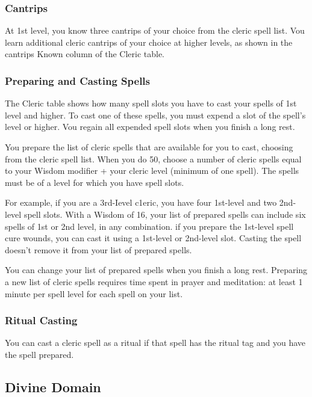 \documentclass[letterpaper,10pt,twoside,twocolumn,openany]{book}
\begin{document}
\subsubsection{Cantrips}

At 1st level, you know three cantrips of your choice from the cleric spell list. Vou learn additional cleric cantrips of your choice at higher levels, as shown in the cantrips Known column of the Cleric table.

\subsubsection{Preparing and Casting Spells}

The Cleric table shows how many spell slots you have to cast your spells of 1st level and higher. To cast one of these spells, you must expend a slot of the spell's level or higher. Vou regain all expended spell slots when you finish a long rest.

You prepare the list of cleric spells that are available for you to cast, choosing from the cleric spell list. When you do 50, choose a number of cleric spells equal to your Wisdom modifier + your cleric level (minimum of one spell). The spells must be of a level for which you have spell slots.

For example, if you are a 3rd-Ievel c1eric, you have four 1st-level and two 2nd-level spell slots. With a Wisdom of 16, your list of prepared spells can include six spells of 1st or 2nd level, in any combination. if you prepare the 1st-level spell cure wounds, you can cast it using a 1st-level or 2nd-level slot. Casting the spell doesn't remove it from your list of prepared spells.

You can change your list of prepared spells when you finish a long rest. Preparing a new list of cleric spells requires time spent in prayer and meditation: at least 1 minute per spell level for each spell on your list.

\subsubsection{Ritual Casting}

You can cast a cleric spell as a ritual if that spell has the ritual tag and you have the spell prepared.

\subsection{Divine Domain}
\end{document}
